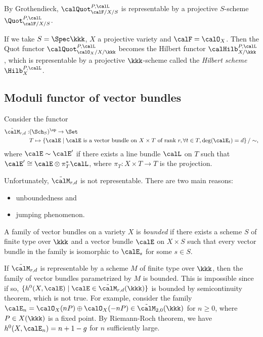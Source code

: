     By Grothendieck, \(\calQuot_{\calF/X/S}^{P,\calL}\) is representable by a projective \(S\)-scheme \(\Quot_{\calF/X/S}^{P,\calL}\).

    If we take \(S = \Spec \kkk\), \(X\) a projective variety and \(\calF = \calO_X\).
    Then the Quot functor \(\calQuot_{\calO_X/X/\kkk}^{P,\calL}\) becomes the Hilbert functor \(\calHilb_{X/\kkk}^{P,\calL}\), which is representable by a projective \(\kkk\)-scheme called the \emph{Hilbert scheme} \(\Hilb_X^{P,\calL}\).

\subsection{Moduli functor of vector bundles}

    Consider the functor 
    \begin{align*}
        \tilde{\calM}_{r,d} : & (\Sch_S)^{\op} \to \Set \\
        & T \mapsto \left\{ 
            \calE 
        \;\middle|\;
            \calE \text{ is a vector bundle on } X \times T \text{ of rank } r, \forall t \in T, \deg(\calE_t) = d
         \right\}/ \sim,
    \end{align*}
    where \(\calE \sim \calE'\) if there exists a line bundle \(\calL\) on \(T\) such that \(\calE' \cong \calE \otimes \pi_T^* \calL\), where \(\pi_T : X \times T \to T\) is the projection.

    Unfortunately, \(\tilde{\calM}_{r,d}\) is not representable.
    There are two main reasons:
    \begin{itemize}
        \item unboundedness and 
        \item jumping phenomenon.
    \end{itemize}

    \begin{definition}\label{def:bounded_family}
        A family of vector bundles on a variety \(X\) is \emph{bounded} 
        if there exists a scheme \(S\) of finite type over \(\kkk\) and a vector bundle \(\calE\) on \(X \times S\) 
        such that every vector bundle in the family is isomorphic to \(\calE_s\) for some \(s \in S\).
    \end{definition}

    If \(\tilde{\calM}_{r,d}\) is representable by a scheme \(M\) of finite type over \(\kkk\), then the family of vector bundles parametrized by \(M\) is bounded.
    This is impossible since if so, \(\{h^0(X,\calE) \mid \calE \in \tilde{\calM}_{r,d}(\kkk)\}\) is bounded by semicontinuity theorem, which is not true.
    For example, consider the family \(\calE_n = \calO_X(nP) \oplus \calO_X(-nP) \in \tilde{\calM}_{2,0}(\kkk)\) for \(n \geq 0\), where \(P \in X(\kkk)\) is a fixed point.
    By Riemann-Roch theorem, we have \(h^0(X,\calE_n) = n + 1-g\) for \(n\) sufficiently large.

